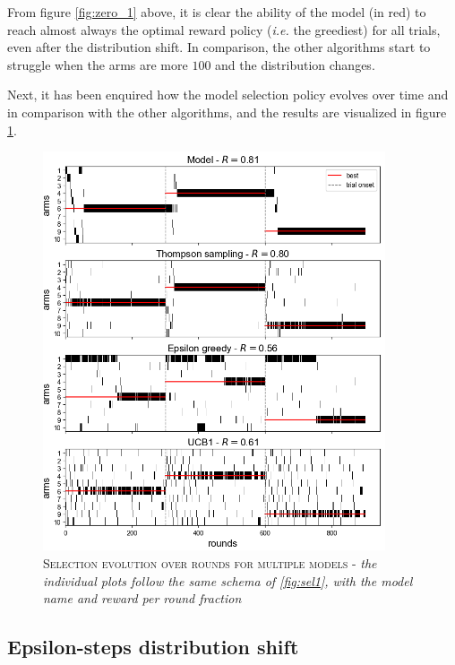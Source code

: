 \noindent From figure \ref{fig:zero_1} above, it is clear the ability of the model (in red) to reach almost always the optimal reward policy (\textit{i.e.} the greediest) for all trials, even after the distribution shift.
In comparison, the other algorithms start to struggle when the arms are more $100$ and the distribution changes.

Next, it has been enquired how the model selection policy evolves over time and in comparison with the other algorithms, and the results are visualized in figure \ref{fig:sel2}.

\begin{figure}[ht]
    \centering
    \includegraphics[width=0.9\textwidth]{figures/selections_many.png}
    \caption{\textsc{Selection evolution over rounds for multiple models} - \textit{the individual plots follow the same schema of \ref{fig:sel1}, with the model name and reward per round fraction}}
    \label{fig:sel2}
\end{figure}


\subsection{Epsilon-steps distribution shift}

